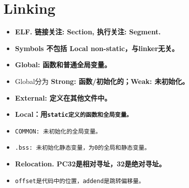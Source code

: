 \section{Linking}
\begin{itemize}[nosep]
    \item \bf{ELF}. 链接关注: Section, 执行关注: Segment.
    \item \bf{Symbols} 不包括 Local non-static，与linker无关。
    \item \bf{Global}: 函数和普通全局变量。
    \item \quad Global分为 \bf{Strong}: 函数/初始化的；\bf{Weak}: 未初始化。
    \item \bf{External}: 定义在其他文件中。
    \item \bf{Local}：用\tt{static}定义的函数和全局变量。
    \item \tt{COMMON}: 未初始化的全局变量。
    \item \tt{.bss}: 未初始化静态变量，为0的全局和静态变量。
    \item \bf{Relocation.} PC32是相对寻址，32是绝对寻址。
    \item \quad \tt{offset}是代码中的位置，\tt{addend}是跳转偏移量。
\end{itemize}
